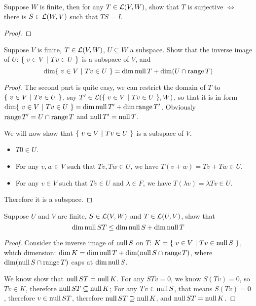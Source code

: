 \documentclass[../main.tex]{subfiles}
\begin{document}
\begin{exercise}
  Suppose $W$ is finite, then for any $T \in \mathcal{L}(V, W)$,
  show that $T$ is surjective $\iff$ there is $S \in \mathcal{L}(W, V)$ such that $TS = I$.
\end{exercise}
\begin{proof}
   
\end{proof}

\begin{exercise}
  Suppose $V$ is finite, $T \in \mathcal{L}(V, W)$, $U \subseteq W$ a subspace.
  Show that the inverse image of $U$: $\{ \ v \in V \ | \ Tv \in U \ \}$ is
  a subspace of $V$, and
  \[
  \dim \{ \ v \in V \ | \ Tv \in U \ \} = \dim \operatorname{null} T + \dim (U \cap \operatorname{range} T)
  \]
\end{exercise}
\begin{proof}
  The second part is quite easy,
  we can restrict the domain of $T$ to $\{ \ v \in V \ | \ Tv \in U \ \}$, 
  say $T' \in \mathcal{L}(\{ \ v \in V \ | \ Tv \in U \ \}, W)$,
  so that it is in form $\dim \{ \ v \in V \ | \ Tv \in U \ \} = \dim \operatorname{null} T' + \dim \operatorname{range} T'$.
  Obviously $\operatorname{range} T' = U \cap \operatorname{range} T$ and $\operatorname{null} T' = \operatorname{null} T$.

  We will now show that $\{ \ v \in V \ | \ Tv \in U \ \}$ is a subspace of $V$.
  \begin{itemize}
    \item $T0 \in U$.
    \item For any $v, w \in V$ such that $Tv, Tw \in U$, we have $T(v + w) = Tv + Tw \in U$.
    \item For any $v \in V$ such that $Tv \in U$ and $\lambda \in F$, we  have $T(\lambda v) = \lambda Tv \in U$.
  \end{itemize}
  Therefore it is a subspace.
\end{proof}

\begin{exercise}
  Suppose $U$ and $V$ are finite, $S \in \mathcal{L}(V, W)$ and $T \in \mathcal{L}(U, V)$, show that
  \[
  \dim \operatorname{null} ST \le \dim \operatorname{null} S + \dim \operatorname{null} T
  \]
\end{exercise}
\begin{proof}
  Consider the inverse image of $\operatorname{null} S$ on $T$: $K = \{ \ v \in V \ | \ Tv \in \operatorname{null} S \ \}$,
  which dimension: $\dim K = \dim \operatorname{null} T + \dim (\operatorname{null} S \cap \operatorname{range} T)$, where $\dim (\operatorname{null} S \cap \operatorname{range} T)$
  caps at $\dim \operatorname{null} S$.

  We know show that $\operatorname{null} ST = \operatorname{null} K$. For any $STv = 0$, we know $S(Tv) = 0$,
  so $Tv \in K$, therefore $\operatorname{null} ST \subseteq \operatorname{null} K$; For any $Tv \in \operatorname{null} S$,
  that means $S(Tv) = 0$, therefore $v \in \operatorname{null} ST$, therefore $\operatorname{null} ST \supseteq \operatorname{null} K$,
  and $\operatorname{null} ST = \operatorname{null} K$.
\end{proof}
\end{document}
